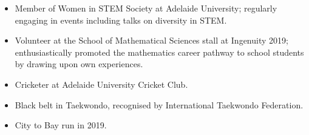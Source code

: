 \vspace{-2ex}
\begin{flushleft}
	\begin{itemize}
		\item Member of Women in STEM Society at Adelaide University; regularly engaging in events including talks on diversity in STEM.

		\item Volunteer at the School of Mathematical Sciences stall at Ingenuity 2019; enthusiastically promoted the mathematics career pathway to school students by drawing upon own experiences.

		\item Cricketer at Adelaide University Cricket Club.

		\item Black belt in Taekwondo, recognised by International Taekwondo Federation.

		\item City to Bay run in 2019.

	\end{itemize}
\end{flushleft}
